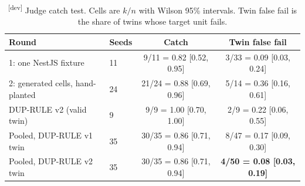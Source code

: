 \documentclass[10pt,a4paper]{article}
\newcommand{\devset}{\textsuperscript{\textsf{\tiny[dev]}}}
\begin{document}
\begin{table}[t]
\centering\small
\caption{\devset{} Judge catch test. Cells are $k/n$ with Wilson 95\% intervals. Twin false fail is the share of
twins whose target unit fails.}
\label{tab:catch}
\begin{tabular}{llcc}
\toprule
Round & Seeds & Catch & Twin false fail \\
\midrule
1: one NestJS fixture & 11 & 9/11 = 0.82 [0.52, 0.95] & 3/33 = 0.09 [0.03, 0.24] \\
2: generated cells, hand-planted & 24 & 21/24 = 0.88 [0.69, 0.96] & 5/14 = 0.36 [0.16, 0.61] \\
DUP-RULE v2 (valid twin) & 9 & 9/9 = 1.00 [0.70, 1.00] & 2/9 = 0.22 [0.06, 0.55] \\
\midrule
Pooled, DUP-RULE v1 twin & 35 & 30/35 = 0.86 [0.71, 0.94] & 8/47 = 0.17 [0.09, 0.30] \\
Pooled, DUP-RULE v2 twin & 35 & 30/35 = 0.86 [0.71, 0.94] & \textbf{4/50 = 0.08 [0.03, 0.19]} \\
\bottomrule
\end{tabular}
\end{table}
\end{document}
